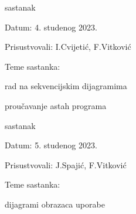 \begin{packed_enum}
			\item  sastanak
			\item[] \begin{packed_item}
				\item Datum: 4. studenog 2023.
				\item Prisustvovali: I.Cvijetić, F.Vitković
				\item Teme sastanka:
				\begin{packed_item}
					\item  rad na sekvencijskim dijagramima
					\item  proučavanje astah programa
				\end{packed_item}
			\end{packed_item}
			
			\item  sastanak
			\item[] \begin{packed_item}
				\item Datum: 5. studenog 2023.
				\item Prisustvovali: J.Spajić, F.Vitković
				\item Teme sastanka:
				\begin{packed_item}
					\item  dijagrami obrazaca uporabe
				\end{packed_item}
			\end{packed_item}
			

\end{packed_enum}
